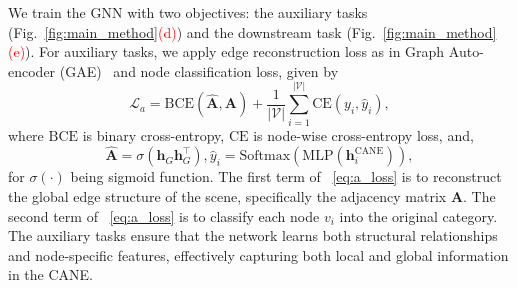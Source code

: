 We train the GNN with two objectives: the auxiliary tasks (Fig.~\ref{fig:main_method}\textcolor{red}{(d)}) and the downstream task (Fig.~\ref{fig:main_method}\textcolor{red}{(e)}). 
%
For auxiliary tasks, we apply edge reconstruction loss as in Graph Auto-encoder (GAE)~\cite{gae} and node classification loss, given by
\small
\begin{equation}
\label{eq:a_loss}
     \mathcal{L}_a = \text{BCE}(\hat{\mathbf{A}}, \mathbf{A})+  \frac{1}{|\mathcal{V}|} \sum_{i=1}^{|\mathcal{V}|} \text{CE} (y_i, \hat{y}_i),
\end{equation}
\normalsize
where $\text{BCE}$ is binary cross-entropy, $\text{CE}$ is node-wise  cross-entropy loss, and,
\small
\begin{equation}
    \hat{\mathbf{A}} = \sigma(\mathbf{h}_G \mathbf{h}_G^\top), \hat{y}_i = \text{Softmax}(\text{MLP} (\mathbf{h}_i^\text{CANE})),
\end{equation} 
\normalsize
for $\sigma(\cdot)$ being sigmoid function.
%
The first term of ~\eqref{eq:a_loss} is to reconstruct the global edge structure of the scene, specifically the adjacency matrix \( \mathbf{A} \). The second term of ~\eqref{eq:a_loss} is to classify each node \( v_i \) into the original category. 
%
The auxiliary tasks ensure that the network learns both structural relationships and node-specific features, effectively capturing both local and global information in the CANE. 

